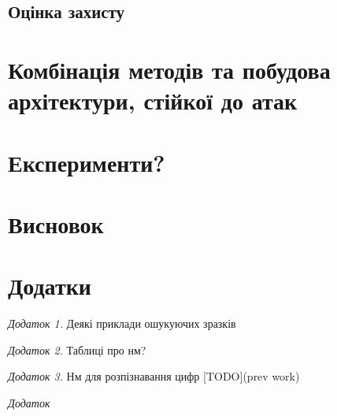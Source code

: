 \documentclass[14pt,a4paper]{extarticle}
\newcounter{e}
\numberwithin{equation}{section}
\numberwithin{figure}{section}
\begin{document}
 
 \subsection{Оцінка захисту}
 
 \newpage
 \thispagestyle{empty}
 \section{Комбінація методів та побудова архітектури, стійкої до атак}
 
 \newpage
 \thispagestyle{empty}
 \section{Експерименти?}
 
 
 
 \newpage
 \thispagestyle{empty}
 \section*{Висновок}
 
 \newpage
 \thispagestyle{empty}
 \section*{Додатки}
 
 \textit{Додаток 1.} Деякі приклади ошукуючих зразків
 
 \textit{Додаток 2.} Таблиці про нм?
 
 \textit{Додаток 3.} Нм для розпізнавання цифр [TODO](prev work)
 
 \textit{Додаток}
\end{document}
